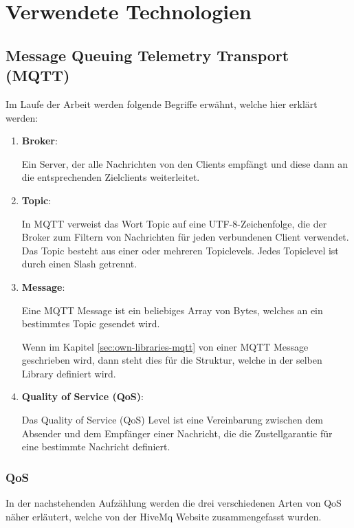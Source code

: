 \chapter{Verwendete Technologien}\label{cha:used-technologies}

\section{Message Queuing Telemetry Transport (MQTT)}\label{sec:mqtt}

Im Laufe der Arbeit werden folgende Begriffe erwähnt, welche hier erklärt werden:

\begin{enumerate}
    \item \textbf{Broker}:
    
    Ein Server, der alle Nachrichten von den Clients empfängt und diese dann an die entsprechenden Zielclients weiterleitet.

    \item \textbf{Topic}:
    
    In MQTT verweist das Wort Topic auf eine UTF-8-Zeichenfolge, die der Broker zum Filtern von Nachrichten für jeden verbundenen Client verwendet. Das Topic besteht aus einer oder mehreren Topiclevels. Jedes Topiclevel ist durch einen Slash getrennt.
    
    \item \textbf{Message}:
    
    Eine MQTT Message ist ein beliebiges Array von Bytes, welches an ein bestimmtes Topic gesendet wird.

    Wenn im Kapitel \ref{sec:own-libraries-mqtt} von einer MQTT Message geschrieben wird, dann steht dies für die Struktur, welche in der selben Library definiert wird.

    \item \textbf{Quality of Service (QoS)}:
    
    Das Quality of Service (QoS) Level ist eine Vereinbarung zwischen dem Absender und dem Empfänger einer Nachricht, die die Zustellgarantie für eine bestimmte Nachricht definiert.
\end{enumerate}

\subsection{QoS}\label{sec:mqtt-qos}

In der nachstehenden Aufzählung werden die drei verschiedenen Arten von QoS näher erläutert, welche von der HiveMq Website\cite{hivemq} zusammengefasst wurden.

